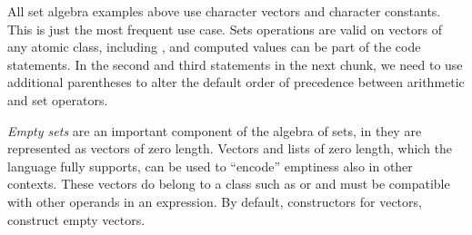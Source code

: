 \documentclass[krantz2]{krantz}\usepackage{knitr}%
\begin{document}
\begin{explainbox}
  All set algebra examples above use character vectors and character constants. This is just the most frequent use case. Sets operations are valid on vectors of any atomic class, including , and computed values can be part of the code statements. In the second and third statements in the next chunk, we need to use additional parentheses to alter the default order of precedence between arithmetic and set operators.

\begin{knitrout}\footnotesize
{}\color{fgcolor}
\end{knitrout}

\emph{Empty sets} are an important component of the algebra of sets, in \Rlang they are represented as vectors of zero length. Vectors and lists of zero length, which the \Rlang language fully supports, can be used to ``encode'' emptiness also in other contexts. These vectors do belong to a class such as  or  and must be compatible with other operands in an expression. By default, constructors for vectors, construct empty vectors.


\end{explainbox}
\end{document}
